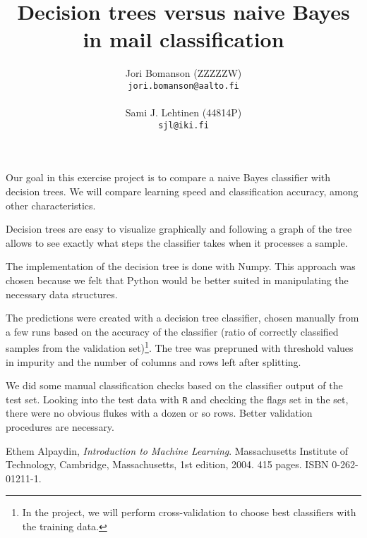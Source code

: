 \documentclass[a4paper,10pt]{article}
\title{Decision trees versus naive Bayes in mail classification}
\author{Jori Bomanson (ZZZZZW) \\
  {\tt jori.bomanson@aalto.fi} \\
  \\
  Sami J. Lehtinen (44814P)\\ 
  {\tt sjl@iki.fi} \\
}
\begin{document}

\maketitle

Our goal in this exercise project is to compare a naive Bayes classifier
with decision trees.  We will compare learning speed and classification
accuracy, among other characteristics.

Decision trees are easy to visualize graphically and following a graph
of the tree allows to see exactly what steps the classifier takes when
it processes a sample.

The implementation of the decision tree is done with Numpy.  This
approach was chosen because we felt that Python would be better suited
in manipulating the necessary data structures.

The predictions were created with a decision tree classifier, chosen
manually from a few runs based on the accuracy of the classifier (ratio
of correctly classified samples from the validation set)\footnote{In the
  project, we will perform cross-validation to choose best classifiers
  with the training data.}.  The tree was prepruned with threshold
values in impurity and the number of columns and rows left after
splitting.

We did some manual classification checks based on the classifier output
of the test set.  Looking into the test data with \texttt{R} and
checking the flags set in the set, there were no obvious flukes with a
dozen or so rows.  Better validation procedures are necessary.

\begin{thebibliography}{9}
  Ethem Alpaydin,
  \emph{Introduction to Machine Learning}.
  Massachusetts Institute of Technology, Cambridge, Massachusetts,
  1st edition,
  2004. 415 pages. ISBN 0-262-01211-1.
\end{thebibliography}
\end{document}
